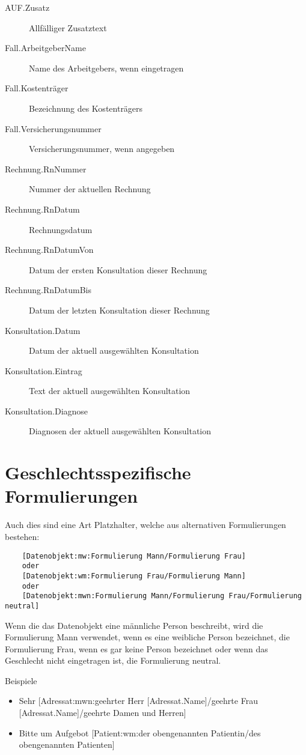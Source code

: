 \begin{description}
  \item [AUF.Zusatz] Allfälliger Zusatztext
  \item [Fall.ArbeitgeberName] Name des Arbeitgebers, wenn eingetragen
  \item [Fall.Kostenträger] Bezeichnung des Kostenträgers
  \item [Fall.Versicherungsnummer] Versicherungsnummer, wenn angegeben
  \item [Rechnung.RnNummer] Nummer der aktuellen Rechnung
  \item [Rechnung.RnDatum] Rechnungsdatum
  \item [Rechnung.RnDatumVon] Datum der ersten Konsultation dieser Rechnung
  \item [Rechnung.RnDatumBis] Datum der letzten Konsultation dieser Rechnung
  \item [Konsultation.Datum] Datum der aktuell ausgewählten Konsultation
  \item [Konsultation.Eintrag] Text der aktuell ausgewählten Konsultation
  \item [Konsultation.Diagnose] Diagnosen der aktuell ausgewählten Konsultation

\end{description}

\section{Geschlechtsspezifische Formulierungen}
Auch dies sind eine Art Platzhalter, welche aus alternativen Formulierungen bestehen:

\begin{verbatim}
    [Datenobjekt:mw:Formulierung Mann/Formulierung Frau]
    oder
    [Datenobjekt:wm:Formulierung Frau/Formulierung Mann]
    oder
    [Datenobjekt:mwn:Formulierung Mann/Formulierung Frau/Formulierung neutral]
\end{verbatim}

Wenn die das Datenobjekt eine  männliche Person beschreibt, wird die Formulierung Mann verwendet, wenn es eine weibliche Person bezeichnet, die Formulierung Frau, wenn es gar keine Person bezeichnet oder wenn das Geschlecht nicht eingetragen ist, die Formulierung neutral.

\medskip

Beispiele
\begin{itemize}
    \item Sehr [Adressat:mwn:geehrter Herr [Adressat.Name]/geehrte Frau [Adressat.Name]/geehrte Damen und Herren]
    \item Bitte um Aufgebot [Patient:wm:der obengenannten Patientin/des obengenannten Patienten]
\end{itemize}

